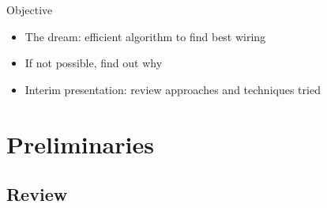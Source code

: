 \documentclass[xcolor=dvipsnames]{beamer}
\newcommand{\?}{\mathrel{?}} %
\begin{document}
\begin{frame}{Objective}
  \begin{itemize}[<+->]
    \item The dream: \alert{efficient algorithm} to find \alert{best wiring}
    \item If not possible, \alert{find out why}
    \item Interim presentation: review approaches and techniques tried
  \end{itemize}
\end{frame}

\section{Preliminaries}

\subsection{Review}
\end{document}

